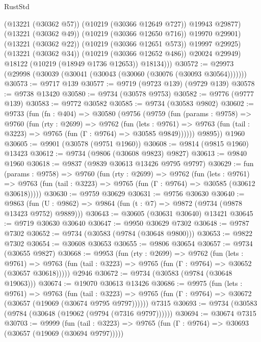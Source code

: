 \begin{lexlean}{RustStd}
\begin{coremodule}
                  (@13221 (@30362 @57))
                  (@10219 (@30366 @12649 @727))
                  @19943
                  @29877)
                (@13221 (@30362 @49))
                (@10219 (@30366 @12650 @716))
                @19970
                @29901)
              (@13221 (@30362 @22))
              (@10219 (@30366 @12651 @573))
              @19997
              @29925)
            (@13221 (@30362 @34))
            (@10219 (@30366 @12652 @486))
            @20024
            @29949)
          @18122
          (@10219 (@18949 @1736 @12653))
          @18134)))
@30572 := @29973 (@29998 (@30039 (@30041 (@30043 (@30060 (@30076 (@30093 @30564)))))))
@30573 := @9717 @139
@30577 := @9719 (@9723 @139) (@9729 @139)
@30578 := @9738 @13420
@30580 := @9734 (@30578 @9753)
@30582 := @9776 (@9777 @139)
@30583 := @9772 @30582
@30585 := @9734 (@30583 @9802)
@30602 := @9733
    (fun (fn : @404) =>
    @30580
      (@9756
        (@9759
          (fun (params : @9758) =>
          @9760
            (fun (rty : @2699) =>
            @9762
              (fun (lets : @9761) =>
              @9763 (fun (tail : @3223) => @9765 (fun (Γ : @9764) => @30585 @9849))))))
        @9895))
    @1960
@30605 := @9901 (@30578 (@9751 @1960))
@30608 := @9814 (@9815 @1960) @13423
@30612 := @9734 (@9806 (@30608 @9823) @9827)
@30613 := @9840 @1960
@30618 := @9837 (@9839 @30613 @13426 @9795 @9797)
@30629 := fun (params : @9758) =>
  @9760
    (fun (rty : @2699) =>
    @9762
      (fun (lets : @9761) =>
      @9763 (fun (tail : @3223) => @9765 (fun (Γ : @9764) => @30585 (@30612 @30618)))))
@30630 := @9759 @30629
@30631 := @9756 @30630
@30640 := @9863
    (fun (U : @9862) => @9864 (fun (t : @7) => @9872 (@9734 (@9878 @13423 @9752) @9889)))
@30643 := @30605 (@30631 @30640) @13421
@30645 := @9719 @30630 @30640
@30647 := @9950 @30629 @7302
@30648 := @9787 @7302
@30652 := @9734 (@30583 (@9784 (@30648 @9800)))
@30653 := @9822 @7302
@30654 := @30608 @30653
@30655 := @9806 @30654
@30657 := @9734 (@30655 @9827)
@30668 := @9953
    (fun (rty : @2699) =>
    @9762
      (fun (lets : @9761) =>
      @9763 (fun (tail : @3223) => @9765 (fun (Γ : @9764) => @30652 (@30657 @30618)))))
    @2946
@30672 := @9734 (@30583 (@9784 (@30648 @19063)))
@30674 := @19070 @30613 @13426
@30686 := @9975
    (fun (lets : @9761) =>
    @9763
      (fun (tail : @3223) =>
      @9765 (fun (Γ : @9764) => @30672 (@30657 (@19069 (@30674 @9795 @9797))))))
    @7315
@30693 := @9734 (@30583 (@9784 (@30648 (@19062 (@9794 (@7316 @9797))))))
@30694 := @30674 @7315
@30703 := @9999
    (fun (tail : @3223) => @9765 (fun (Γ : @9764) => @30693 (@30657 (@19069 (@30694 @9797)))))

\end{coremodule}
\end{lexlean}
